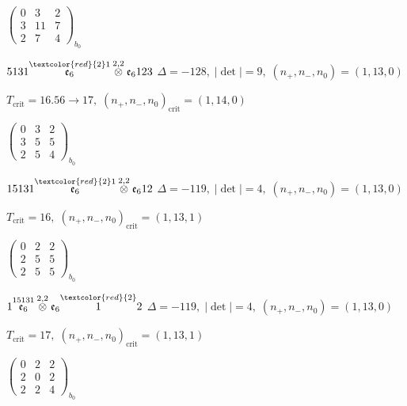 \documentclass[10pt]{article}
\begin{document}
\hspace{2em}$\left(\begin{smallmatrix}0 & 3 & 2 \\ 3 & 11 & 7 \\ 2 & 7 & 4\end{smallmatrix}\right)_{\!b_0}$

\smallskip

$5131\overset{\textcolor{red}{2}1}{\mathfrak{e}_6}\overset{2,2}{\otimes}\mathfrak{e}_6123$ \quad $\Delta=-128,\; |\det|=9,\; (n_+,n_-,n_0)=(1,13,0)$

\hspace{1em}$T_{\text{crit}}=16.56 \to 17,\; (n_+,n_-,n_0)_{\text{crit}}=(1,14,0)$

\hspace{2em}$\left(\begin{smallmatrix}0 & 3 & 2 \\ 3 & 5 & 5 \\ 2 & 5 & 4\end{smallmatrix}\right)_{\!b_0}$

\smallskip

$15131\overset{\textcolor{red}{2}1}{\mathfrak{e}_6}\overset{2,2}{\otimes}\mathfrak{e}_612$ \quad $\Delta=-119,\; |\det|=4,\; (n_+,n_-,n_0)=(1,13,0)$

\hspace{1em}$T_{\text{crit}}=16,\; (n_+,n_-,n_0)_{\text{crit}}=(1,13,1)$

\hspace{2em}$\left(\begin{smallmatrix}0 & 2 & 2 \\ 2 & 5 & 5 \\ 2 & 5 & 5\end{smallmatrix}\right)_{\!b_0}$

$1\overset{15131}{\mathfrak{e}_6}\overset{2,2}{\otimes}\mathfrak{e}_6\overset{\textcolor{red}{2}}{1}2$ \quad $\Delta=-119,\; |\det|=4,\; (n_+,n_-,n_0)=(1,13,0)$

\hspace{1em}$T_{\text{crit}}=17,\; (n_+,n_-,n_0)_{\text{crit}}=(1,13,1)$

\hspace{2em}$\left(\begin{smallmatrix}0 & 2 & 2 \\ 2 & 0 & 2 \\ 2 & 2 & 4\end{smallmatrix}\right)_{\!b_0}$
\end{document}
